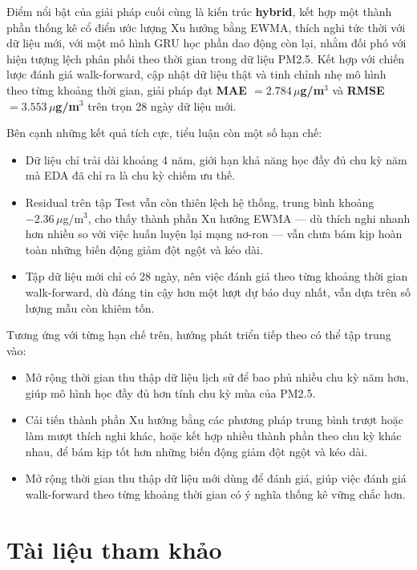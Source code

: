 \documentclass[12pt,oneside]{report}
\begin{document}
Điểm nổi bật của giải pháp cuối cùng là kiến trúc \textbf{hybrid}, kết hợp một thành phần thống kê cổ điển ước lượng Xu hướng bằng EWMA, thích nghi tức thời với dữ liệu mới, với một mô hình GRU học phần dao động còn lại, nhằm đối phó với hiện tượng lệch phân phối theo thời gian trong dữ liệu PM2.5. Kết hợp với chiến lược đánh giá walk-forward, cập nhật dữ liệu thật và tinh chỉnh nhẹ mô hình theo từng khoảng thời gian, giải pháp đạt \textbf{MAE $=2.784\,\mu$g/m$^3$} và \textbf{RMSE $=3.553\,\mu$g/m$^3$} trên trọn 28 ngày dữ liệu mới.

Bên cạnh những kết quả tích cực, tiểu luận còn một số hạn chế:

\begin{itemize}
    \item Dữ liệu chỉ trải dài khoảng 4 năm, giới hạn khả năng học đầy đủ chu kỳ năm mà EDA đã chỉ ra là chu kỳ chiếm ưu thế.
    \item Residual trên tập Test vẫn còn thiên lệch hệ thống, trung bình khoảng $-2.36\,\mu$g/m$^3$, cho thấy thành phần Xu hướng EWMA — dù thích nghi nhanh hơn nhiều so với việc huấn luyện lại mạng nơ-ron — vẫn chưa bám kịp hoàn toàn những biến động giảm đột ngột và kéo dài.
    \item Tập dữ liệu mới chỉ có 28 ngày, nên việc đánh giá theo từng khoảng thời gian walk-forward, dù đáng tin cậy hơn một lượt dự báo duy nhất, vẫn dựa trên số lượng mẫu còn khiêm tốn.
\end{itemize}

Tương ứng với từng hạn chế trên, hướng phát triển tiếp theo có thể tập trung vào:

\begin{itemize}
    \item Mở rộng thời gian thu thập dữ liệu lịch sử để bao phủ nhiều chu kỳ năm hơn, giúp mô hình học đầy đủ hơn tính chu kỳ mùa của PM2.5.
    \item Cải tiến thành phần Xu hướng bằng các phương pháp trung bình trượt hoặc làm mượt thích nghi khác, hoặc kết hợp nhiều thành phần theo chu kỳ khác nhau, để bám kịp tốt hơn những biến động giảm đột ngột và kéo dài.
    \item Mở rộng thời gian thu thập dữ liệu mới dùng để đánh giá, giúp việc đánh giá walk-forward theo từng khoảng thời gian có ý nghĩa thống kê vững chắc hơn.
\end{itemize}

\chapter*{Tài liệu tham khảo}
\end{document}
